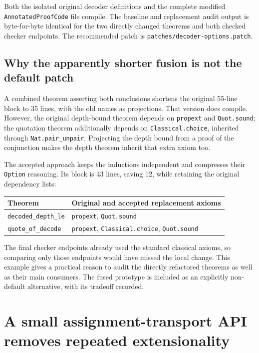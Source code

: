 \documentclass[11pt,letterpaper]{article}
\newcommand{\artifact}[1]{\nolinkurl{#1}}
\begin{document}
Both the isolated original decoder definitions and the complete modified \texttt{AnnotatedProofCode} file compile. The baseline and replacement audit output is byte-for-byte identical for the two directly changed theorems and both checked checker endpoints. The recommended patch is \artifact{patches/decoder-options.patch}.

\subsection{Why the apparently shorter fusion is not the default patch}

A combined theorem asserting both conclusions shortens the original
55-line block to 35 lines, with the old names as projections. That version
does compile. However, the original depth-bound theorem depends on
\texttt{propext} and \texttt{Quot.sound}; the quotation theorem additionally
depends on \texttt{Classical.choice}, inherited through
\texttt{Nat.pair\_unpair}. Projecting the depth bound from a proof of the
conjunction makes the depth theorem inherit that extra axiom too.

The accepted approach keeps the inductions independent and compresses
their \texttt{Option} reasoning. Its block is 43 lines, saving 12, while
retaining the original dependency lists:

\begin{center}
\begin{tabular}{@{}lp{}@{}}
\toprule
Theorem & Original and accepted replacement axioms\\
\midrule
\texttt{decoded\_depth\_le} & \texttt{propext}, \texttt{Quot.sound}\\
\texttt{quote\_of\_decode} & \texttt{propext}, \texttt{Classical.choice}, \texttt{Quot.sound}\\
\bottomrule
\end{tabular}
\end{center}

The final checker endpoints already used the standard classical axioms,
so comparing only those endpoints would have missed the local change.
This example gives a practical reason to audit the directly refactored
theorems as well as their main consumers. The fused prototype is included
as an explicitly non-default alternative, with its tradeoff recorded.

\section{A small assignment-transport API removes repeated extensionality}
\end{document}
